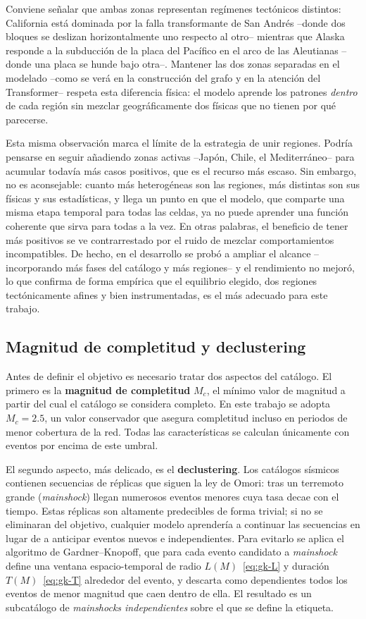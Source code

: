 Conviene señalar que ambas zonas representan regímenes tectónicos distintos: California
está dominada por la falla transformante de San Andrés --donde dos bloques se deslizan
horizontalmente uno respecto al otro-- mientras que Alaska responde a la subducción de la
placa del Pacífico en el arco de las Aleutianas --donde una placa se hunde bajo otra--.
Mantener las dos zonas separadas en el modelado --como se verá en la construcción del grafo
y en la atención del Transformer-- respeta esta diferencia física: el modelo aprende los
patrones \emph{dentro} de cada región sin mezclar geográficamente dos físicas que no tienen
por qué parecerse.

Esta misma observación marca el límite de la estrategia de unir regiones. Podría pensarse en
seguir añadiendo zonas activas --Japón, Chile, el Mediterráneo-- para acumular todavía más
casos positivos, que es el recurso más escaso. Sin embargo, no es aconsejable: cuanto más
heterogéneas son las regiones, más distintas son sus físicas y sus estadísticas, y llega un
punto en que el modelo, que comparte una misma etapa temporal para todas las celdas, ya no
puede aprender una función coherente que sirva para todas a la vez. En otras palabras, el
beneficio de tener más positivos se ve contrarrestado por el ruido de mezclar comportamientos
incompatibles. De hecho, en el desarrollo se probó a ampliar el alcance --incorporando más
fases del catálogo y más regiones-- y el rendimiento no mejoró, lo que confirma de forma
empírica que el equilibrio elegido, dos regiones tectónicamente afines y bien instrumentadas,
es el más adecuado para este trabajo.

\subsection{Magnitud de completitud y declustering}
\label{md-declustering}

Antes de definir el objetivo es necesario tratar dos aspectos del catálogo. El primero es
la \textbf{magnitud de completitud} \(M_c\), el mínimo valor de magnitud a partir del cual
el catálogo se considera completo. En este trabajo se adopta \(M_c = 2.5\), un valor
conservador que asegura completitud incluso en periodos de menor cobertura de la red. Todas
las características se calculan únicamente con eventos por encima de este umbral.

El segundo aspecto, más delicado, es el \textbf{declustering}. Los catálogos sísmicos
contienen secuencias de réplicas que siguen la ley de Omori: tras un terremoto grande
(\textit{mainshock}) llegan numerosos eventos menores cuya tasa decae con el tiempo. Estas
réplicas son altamente predecibles de forma trivial; si no se eliminaran del objetivo,
cualquier modelo aprendería a continuar las secuencias en lugar de a anticipar eventos
nuevos e independientes. Para evitarlo se aplica el algoritmo de Gardner--Knopoff, que para
cada evento candidato a \textit{mainshock} define una ventana espacio-temporal de radio
\(L(M)\)~\eqref{eq:gk-L} y duración \(T(M)\)~\eqref{eq:gk-T} alrededor del evento, y descarta
como dependientes todos los eventos de menor magnitud que caen dentro de ella. El resultado
es un subcatálogo de \emph{mainshocks independientes} sobre el que se define la etiqueta.

